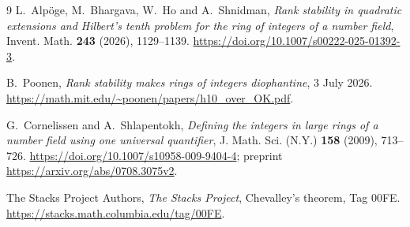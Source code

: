 \documentclass[11pt,a4paper]{article}
\theoremstyle{definition}
\begin{document}
\begin{thebibliography}{9}
L.~Alp\"oge, M.~Bhargava, W.~Ho and A.~Shnidman,
\emph{Rank stability in quadratic extensions and Hilbert's tenth
problem for the ring of integers of a number field},
Invent. Math. \textbf{243} (2026), 1129--1139.
\url{https://doi.org/10.1007/s00222-025-01392-3}.

B.~Poonen, \emph{Rank stability makes rings of integers diophantine},
3 July 2026.
\url{https://math.mit.edu/~poonen/papers/h10_over_OK.pdf}.

G.~Cornelissen and A.~Shlapentokh,
\emph{Defining the integers in large rings of a number field using
one universal quantifier},
J. Math. Sci. (N.Y.) \textbf{158} (2009), 713--726.
\url{https://doi.org/10.1007/s10958-009-9404-4};
preprint \url{https://arxiv.org/abs/0708.3075v2}.

The Stacks Project Authors, \emph{The Stacks Project},
Chevalley's theorem, Tag 00FE.
\url{https://stacks.math.columbia.edu/tag/00FE}.
\end{thebibliography}
\end{document}
